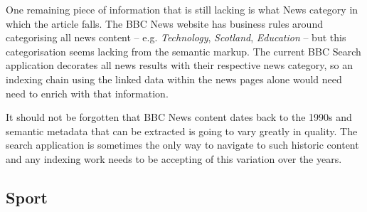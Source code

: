 One remaining piece of information that is still lacking is
what News category in which the article falls. The BBC News
website has business rules around categorising all news
content -- e.g. \emph{Technology}, \emph{Scotland}, \emph{Education}
-- but this categorisation seems lacking from the semantic markup. The
current BBC Search application decorates all news results with
their respective news category, so an indexing chain using
the linked data within the news pages alone would need need
to enrich with that information.

It should not be forgotten that BBC News content dates back to the
1990s and semantic metadata that can be extracted is going
to vary greatly in quality. The search application is sometimes
the only way to navigate to such historic content and any indexing
work needs to be accepting of this variation over the years.

\subsection{Sport}

